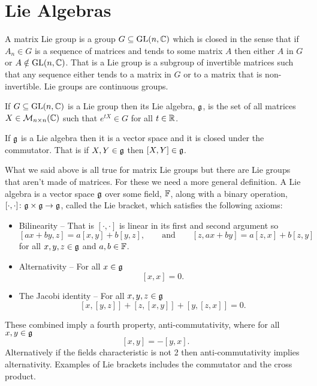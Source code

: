 \section{Lie Algebras}\label{app:Lie algebras}
A matrix Lie group is a group \(G\subseteq \mathrm{GL}(n, \mathbb{C})\) which is closed in the sense that if \(A_n\in G\) is a sequence of matrices and tends to some matrix \(A\) then either \(A\) in \(G\) or \(A \notin \mathrm{GL}(n, \mathbb{C})\).
That is a Lie group is a subgroup of invertible matrices such that any sequence either tends to a matrix in \(G\) or to a matrix that is non-invertible.
Lie groups are continuous groups.

If \(G\subseteq \mathrm{GL}(n, \mathbb{C})\) is a Lie group then its Lie algebra, \(\mathfrak{g}\), is the set of all matrices \(X\in\mathcal{M}_{{n}\times{n}}({\mathbb{C}})\) such that \(e^{tX}\in G\) for all \(t\in\mathbb{R}\).

If \(\mathfrak{g}\) is a Lie algebra then it is a vector space and it is closed under the commutator.
That is if \(X, Y\in\mathfrak{g}\) then \([X, Y]\in\mathfrak{g}\).

What we said above is all true for matrix Lie groups but there are Lie groups that aren't made of matrices.
For these we need a more general definition.
A Lie algebra is a vector space \(\mathfrak{g}\) over some field, \(\mathbb{F}\), along with a binary operation, \([\cdot, \cdot]\colon\mathfrak{g}\times\mathfrak{g}\to\mathfrak{g}\), called the Lie bracket, which satisfies the following axioms:
\begin{itemize}
    \item Bilinearity -- That is \([\cdot, \cdot]\) is linear in its first and second argument so
    \[[ax + by, z] = a[x, y] + b[y, z], \qquad\text{and}\qquad [z, ax + by] = a[z, x] + b[z, y]\]
    for all \(x, y, z\in\mathfrak{g}\) and \(a, b\in\mathbb{F}\).
    \item Alternativity -- For all \(x\in\mathfrak{g}\)
    \[[x, x] = 0.\]
    \item The Jacobi identity -- For all \(x, y, z \in\mathfrak{g}\)
    \[[x, [y, z]] + [z, [x, y]] + [y, [z, x]] = 0.\]
\end{itemize}
These combined imply a fourth property, anti-commutativity, where for all \(x, y\in\mathfrak{g}\)
\[[x, y] = -[y, x].\]
Alternatively if the fields characteristic is not 2 then anti-commutativity implies alternativity.
Examples of Lie brackets includes the commutator and the cross product.


